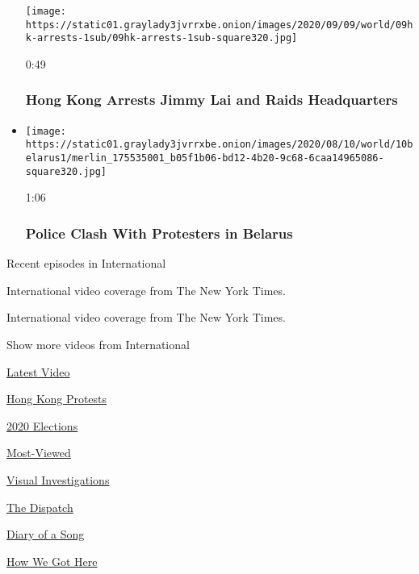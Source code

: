 \begin{itemize}
  \texttt{[image: https://static01.graylady3jvrrxbe.onion/images/2020/09/09/world/09hk-arrests-1sub/09hk-arrests-1sub-square320.jpg]}

  0:49

  \hypertarget{hong-kong-arrests-jimmy-lai-and-raids-headquarters}{%
  \subsubsection{Hong Kong Arrests Jimmy Lai and Raids
  Headquarters}\label{hong-kong-arrests-jimmy-lai-and-raids-headquarters}}
\item
  \href{https://www.nytimes3xbfgragh.onion/video/world/100000007281204/belarus-election-protests.html?action=click\&module=video-series-bar\&region=header\&pgtype=Article\&playlistId=video/world}{}

  \texttt{[image: https://static01.graylady3jvrrxbe.onion/images/2020/08/10/world/10belarus1/merlin\_175535001\_b05f1b06-bd12-4b20-9c68-6caa14965086-square320.jpg]}

  1:06

  \hypertarget{police-clash-with-protesters-in-belarus}{%
  \subsubsection{Police Clash With Protesters in
  Belarus}\label{police-clash-with-protesters-in-belarus}}
\end{itemize}

Recent episodes in International

International video coverage from The New York Times.

International video coverage from The New York Times.

Show more videos from International

\href{/video}{}

\href{/video/latest-video}{Latest Video}

\href{/video/hk-protest}{Hong Kong Protests}

\href{/video/2020-Elections}{2020 Elections}

\href{/video/Most-Viewed}{Most-Viewed}

\href{/video/investigations}{Visual Investigations}

\href{/video/on-the-ground}{The Dispatch}

\href{/video/diaryofasong}{Diary of a Song}

\href{/video/how-we-got-here}{How We Got Here}

